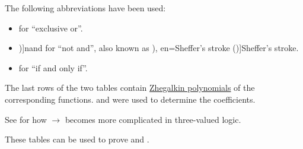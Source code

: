 \begin{proposition}
  The following abbreviations have been used:
  \begin{itemize}
    \item {} for \enquote{exclusive or}.
    \item \term[en=nand (\cite[40]{Hinman2005Logic})]{nand} for \enquote{not and}, also known as \term[ru=штрих Шеффера (\cite[29]{Эдельман1975Логика}), en=Sheffer's stroke (\cite[40]{Hinman2005Logic})]{Sheffer's stroke}.
    \item {} for \enquote{if and only if}.
  \end{itemize}
\end{proposition}
\begin{comments}
  \item The last rows of the two tables contain \hyperref[def:zhegalkin_polynomial]{Zhegalkin polynomials} of the corresponding functions.  and  were used to determine the coefficients.

  \item See  for how \( {\rightarrow} \) becomes more complicated in three-valued logic.

  \item These tables can be used to prove  and .
\end{comments}

